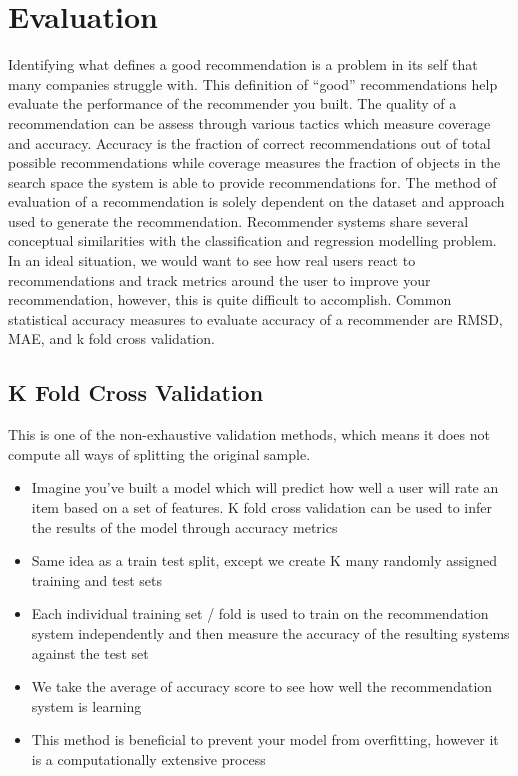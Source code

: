 \section{Evaluation}
Identifying what defines a good recommendation is a problem in its self that many companies struggle with. This definition of “good” recommendations help evaluate the performance of the recommender you built. 
The quality of a recommendation can be assess through various tactics which measure coverage and accuracy. 
Accuracy is the fraction of correct recommendations out of total possible recommendations while coverage measures the fraction of objects in the search space the system is able to provide recommendations for. 
The method of evaluation of a recommendation is solely dependent on the dataset and approach used to generate the recommendation. 
Recommender systems share several conceptual similarities with the classification and regression modelling problem. 
In an ideal situation, we would want to see how real users react to recommendations and track metrics around the user to improve your recommendation, however, this is quite difficult to accomplish. 
Common statistical accuracy measures to evaluate accuracy of a recommender are RMSD, MAE, and k fold cross validation.

\subsection{K Fold Cross Validation}
This is one of the non-exhaustive validation methods, which means it does not compute all ways of splitting the original sample.
\begin{itemize}
\item Imagine you’ve built a model which will predict how well a user will rate an item based on a set of features. K fold cross validation can be used to infer the results of the model through accuracy metrics
\item Same idea as a train test split, except we create K many randomly assigned training and test sets
\item Each individual training set / fold is used to train on the recommendation system independently and then measure the accuracy of the resulting systems against the test set
\item We take the average of accuracy score to see how well the recommendation system is learning
\item This method is beneficial to prevent your model from overfitting, however it is a computationally extensive process
\end{itemize}

